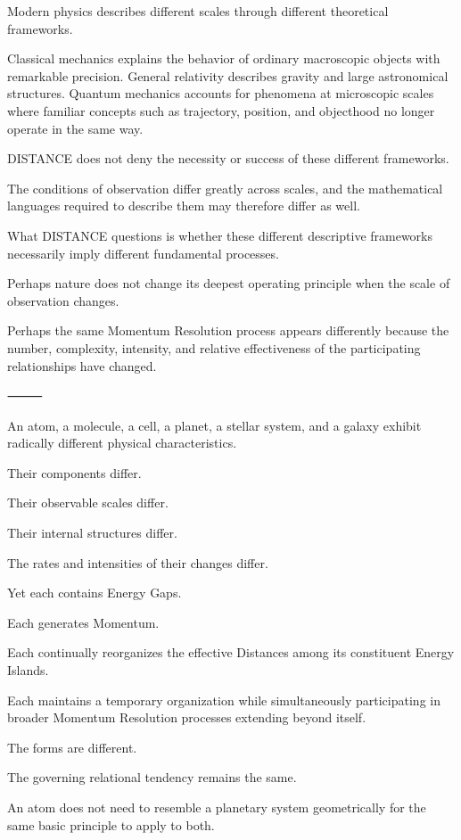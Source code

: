 Modern physics describes different scales through different theoretical frameworks.

Classical mechanics explains the behavior of ordinary macroscopic objects with remarkable precision. General relativity describes gravity and large astronomical structures. Quantum mechanics accounts for phenomena at microscopic scales where familiar concepts such as trajectory, position, and objecthood no longer operate in the same way.

DISTANCE does not deny the necessity or success of these different frameworks.

The conditions of observation differ greatly across scales, and the mathematical languages required to describe them may therefore differ as well.

What DISTANCE questions is whether these different descriptive frameworks necessarily imply different fundamental processes.

Perhaps nature does not change its deepest operating principle when the scale of observation changes.

Perhaps the same Momentum Resolution process appears differently because the number, complexity, intensity, and relative effectiveness of the participating relationships have changed.

⸻

An atom, a molecule, a cell, a planet, a stellar system, and a galaxy exhibit radically different physical characteristics.

Their components differ.

Their observable scales differ.

Their internal structures differ.

The rates and intensities of their changes differ.

Yet each contains Energy Gaps.

Each generates Momentum.

Each continually reorganizes the effective Distances among its constituent Energy Islands.

Each maintains a temporary organization while simultaneously participating in broader Momentum Resolution processes extending beyond itself.

The forms are different.

The governing relational tendency remains the same.

An atom does not need to resemble a planetary system geometrically for the same basic principle to apply to both.

